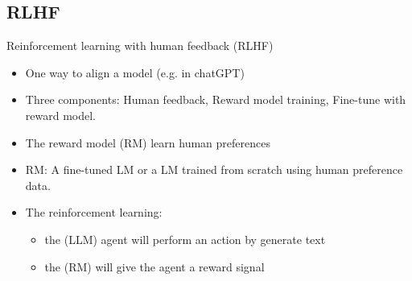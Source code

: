 \documentclass[10pt]{beamer}
\begin{document}
\subsection{RLHF}

\begin{frame}{Reinforcement learning with human feedback (RLHF)}

\begin{itemize}
\item One way to align a model (e.g. in chatGPT)
\item Three components: Human feedback, Reward model training, Fine-tune with reward model.
\item {} The reward model (RM) learn human preferences
\item  RM: A fine-tuned LM or a LM trained from scratch using human preference data.
\item The reinforcement learning:
\begin{itemize}
\item the (LLM) agent  will perform an action by generate text
\item the (RM) will give the agent a reward signal
\end{itemize}
\end{itemize}

\end{frame}
\end{document}
